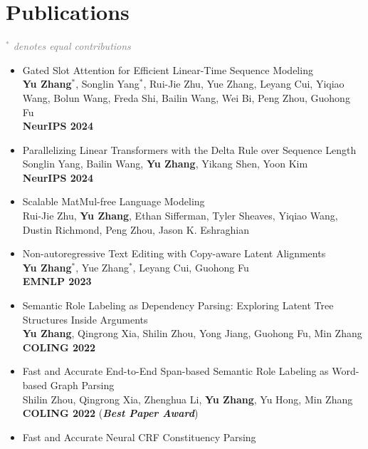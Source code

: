 \documentclass[a4paper,12pt]{article}
\begin{document}
\section{Publications} 
\textcolor{gray}{\emph{$^*$ denotes equal contributions}}


\begin{itemize}[leftmargin=18pt]
\item Gated Slot Attention for Efficient Linear-Time Sequence Modeling \\
    \textbf{Yu Zhang$^*$}, Songlin Yang$^*$, Rui-Jie Zhu, Yue Zhang, Leyang Cui, Yiqiao Wang, Bolun Wang, Freda Shi, Bailin Wang, Wei Bi, Peng Zhou, Guohong Fu \\
    \textbf{NeurIPS 2024}
\item Parallelizing Linear Transformers with the Delta Rule over Sequence Length \\
    Songlin Yang, Bailin Wang, \textbf{Yu Zhang}, Yikang Shen, Yoon Kim \\
    \textbf{NeurIPS 2024}
\item Scalable MatMul-free Language Modeling \\
    Rui-Jie Zhu, \textbf{Yu Zhang}, Ethan Sifferman, Tyler Sheaves, Yiqiao Wang, Dustin Richmond, Peng Zhou, Jason K. Eshraghian
\item Non-autoregressive Text Editing with Copy-aware Latent Alignments \\
    \textbf{Yu Zhang$^*$}, Yue Zhang$^*$, Leyang Cui, Guohong Fu\\
    \textbf{EMNLP 2023}
\item Semantic Role Labeling as Dependency Parsing: Exploring Latent Tree Structures Inside Arguments\\
    \textbf{Yu Zhang}, Qingrong Xia, Shilin Zhou, Yong Jiang, Guohong Fu, Min Zhang\\
    \textbf{COLING 2022}
\item Fast and Accurate End-to-End Span-based Semantic Role Labeling as Word-based Graph Parsing\\
    Shilin Zhou, Qingrong Xia, Zhenghua Li, \textbf{Yu Zhang}, Yu Hong, Min Zhang\\
    \textbf{COLING 2022} (\textbf{\emph{\textcolor{brickred}{Best Paper Award}}})
\item Fast and Accurate Neural CRF Constituency Parsing\\

\end{itemize}
\end{document}
